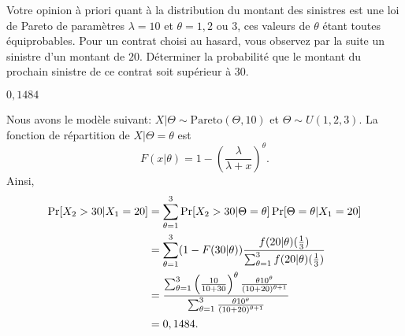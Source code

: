 \begin{exercice}
  Votre opinion à priori quant à la distribution du montant des
  sinistres est une loi de Pareto de paramètres $\lambda = 10$ et
  $\theta = 1, 2$ ou $3$, ces valeurs de $\theta$ étant toutes
  équiprobables. Pour un contrat choisi au hasard, vous observez par
  la suite un sinistre d'un montant de $20$. Déterminer la probabilité
  que le montant du prochain sinistre de ce contrat soit supérieur à
  $30$.
  \begin{rep}
    $0,1484$
  \end{rep}
  \begin{sol}
    Nous avons le modèle suivant:
    $X|\Theta \sim \text{Pareto}(\Theta, 10)$ et
    $\Theta \sim U(1, 2, 3)$. La fonction de répartition de
    $X|\Theta = \theta$ est
    \begin{equation*}
      F(x|\theta) = 1 -
      \left(
        \frac{\lambda}{\lambda + x}
      \right)^\theta.
    \end{equation*}
    Ainsi,
    \begin{align*}
      \Pr[X_2 > 30|X_1 = 20]
      &= \sum_{\theta=1}^3
      \Pr[X_2 > 30|\Theta = \theta] \Pr[\Theta = \theta|X_1 = 20] \\
      &= \sum_{\theta=1}^3 (1 - F(30|\theta))
      \frac{f(20|\theta) (\frac{1}{3})}{%
        \sum_{\theta = 1}^3 f(20|\theta) (\frac{1}{3})} \\
      &= \frac{ \sum_{\theta=1}^3 \left(\frac{10}{10 + 30}\right)^\theta
        \frac{\theta 10^\theta}{(10 + 20)^{\theta+1}}}{
        \sum_{\theta=1}^3
        \frac{\theta 10^\theta}{(10 + 20)^{\theta+1}}} \\
      &= 0,1484.
    \end{align*}
  \end{sol}
\end{exercice}

